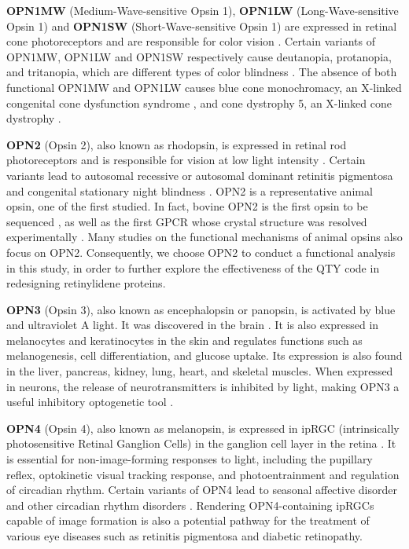 \documentclass[fleqn, 10pt, lineno]{manuscript}
\begin{document}
\textbf{OPN1MW} (Medium-Wave-sensitive Opsin 1), \textbf{OPN1LW} (Long-Wave-sensitive Opsin 1) and \textbf{OPN1SW} (Short-Wave-sensitive Opsin 1) are expressed in retinal cone photoreceptors and are responsible for color vision \citep{Bowmaker_1980}. Certain variants of OPN1MW, OPN1LW and OPN1SW respectively cause deutanopia, protanopia, and tritanopia, which are different types of color blindness \citep{Ueyama_2002, Baraas_2012}. The absence of both functional OPN1MW and OPN1LW causes blue cone monochromacy, an X-linked congenital cone dysfunction syndrome \citep{Wissinger_2022}, and cone dystrophy 5, an X-linked cone dystrophy \citep{Gardner_2010}. 

\textbf{OPN2} (Opsin 2), also known as rhodopsin, is expressed in retinal rod photoreceptors and is responsible for vision at low light intensity \citep{Hubbard_1958}. Certain variants lead to autosomal recessive or autosomal dominant retinitis pigmentosa and congenital stationary night blindness \citep{Fanelli_2021}. OPN2 is a representative animal opsin, one of the first studied. In fact, bovine OPN2 is the first opsin to be sequenced \citep{Nathans_1984}, as well as the first GPCR whose crystal structure was resolved experimentally \citep{Palczeski_2000}. Many studies on the functional mechanisms of animal opsins also focus on OPN2. Consequently, we choose OPN2 to conduct a functional analysis in this study, in order to further explore the effectiveness of the QTY code in redesigning retinylidene proteins. 

\textbf{OPN3} (Opsin 3), also known as encephalopsin or panopsin, is activated by blue and ultraviolet A light. It was discovered in the brain \citep{Blackshaw_1999}. It is also expressed in melanocytes and keratinocytes in the skin and regulates functions such as melanogenesis, cell differentiation, and glucose uptake. Its expression is also found in the liver, pancreas, kidney, lung, heart, and skeletal muscles. When expressed in neurons, the release of neurotransmitters is inhibited by light, making OPN3 a useful inhibitory optogenetic tool \citep{Copits_2021}. 

\textbf{OPN4} (Opsin 4), also known as melanopsin, is expressed in ipRGC (intrinsically photosensitive Retinal Ganglion Cells) in the ganglion cell layer in the retina \citep{Provencio_1998}. It is essential for non-image-forming responses to light, including the pupillary reflex, optokinetic visual tracking response, and photoentrainment and regulation of circadian rhythm. Certain variants of OPN4 lead to seasonal affective disorder and other circadian rhythm disorders \citep{Berson_2002}. Rendering OPN4-containing ipRGCs capable of image formation is also a potential pathway for the treatment of various eye diseases such as retinitis pigmentosa and diabetic retinopathy. 
\end{document}
